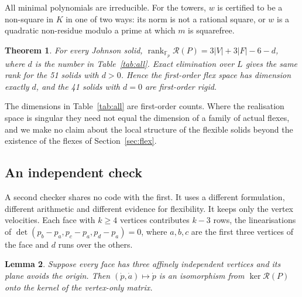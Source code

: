 \documentclass[11pt]{amsart}
\newtheorem{theorem}{Theorem}[section]
\newtheorem{lemma}[theorem]{Lemma}
\theoremstyle{remark}
\newcommand{\F}{\mathbb F}
\newcommand{\RR}{\mathcal R}
\begin{document}
All minimal polynomials are irreducible. For the towers, $w$ is certified to be a non-square in $K$ in one of two ways: its norm is not a rational square, or $w$ is a quadratic non-residue modulo a prime at which $m$ is squarefree.

\begin{theorem}\label{thm:rank}
For every Johnson solid, $\operatorname{rank}_{\F_p}\RR(P)=3|V|+3|F|-6-d$, where $d$ is the number in Table~\ref{tab:all}. Exact elimination over $L$ gives the same rank for the 51 solids with $d>0$. Hence the first-order flex space has dimension exactly $d$, and the 41 solids with $d=0$ are first-order rigid.
\end{theorem}

The dimensions in Table~\ref{tab:all} are first-order counts. Where the realisation space is singular they need not equal the dimension of a family of actual flexes, and we make no claim about the local structure of the flexible solids beyond the existence of the flexes of Section~\ref{sec:flex}.

\subsection{An independent check}
A second checker shares no code with the first. It uses a different formulation, different arithmetic and different evidence for flexibility. It keeps only the vertex velocities. Each face with $k\ge4$ vertices contributes $k-3$ rows, the linearisations of $\det(p_b-p_a,p_c-p_a,p_d-p_a)=0$, where $a,b,c$ are the first three vertices of the face and $d$ runs over the others.

\begin{lemma}\label{lem:vertexonly}
Suppose every face has three affinely independent vertices and its plane avoids the origin. Then $(\dot p,\dot a)\mapsto\dot p$ is an isomorphism from $\ker\RR(P)$ onto the kernel of the vertex-only matrix.
\end{lemma}
\end{document}
